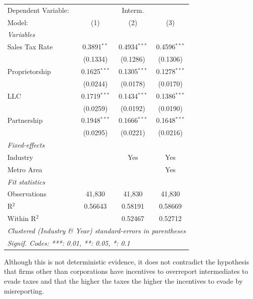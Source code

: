 \documentclass[
  12pt]{article}
\theoremstyle{definition}
\theoremstyle{remark}
\begin{document}
\begin{table}
\begin{minipage}{\linewidth}
\begingroup
\centering
\begin{tabular}{lccc}
   \tabularnewline \midrule \midrule
   Dependent Variable: & \multicolumn{3}{c}{Interm.}\\
   Model:         & (1)            & (2)            & (3)\\  
   \midrule
   \emph{Variables}\\
   Sales Tax Rate & 0.3891$^{**}$  & 0.4934$^{***}$ & 0.4596$^{***}$\\   
                  & (0.1334)       & (0.1286)       & (0.1306)\\   
   Proprietorship & 0.1625$^{***}$ & 0.1305$^{***}$ & 0.1278$^{***}$\\   
                  & (0.0244)       & (0.0178)       & (0.0170)\\   
   LLC            & 0.1719$^{***}$ & 0.1434$^{***}$ & 0.1386$^{***}$\\   
                  & (0.0259)       & (0.0192)       & (0.0190)\\   
   Partnership    & 0.1948$^{***}$ & 0.1666$^{***}$ & 0.1648$^{***}$\\   
                  & (0.0295)       & (0.0221)       & (0.0216)\\   
   \midrule
   \emph{Fixed-effects}\\
   Industry       &                & Yes            & Yes\\  
   Metro Area     &                &                & Yes\\  
   \midrule
   \emph{Fit statistics}\\
   Observations   & 41,830         & 41,830         & 41,830\\  
   R$^2$          & 0.56643        & 0.58191        & 0.58669\\  
   Within R$^2$   &                & 0.52467        & 0.52712\\  
   \midrule \midrule
   \multicolumn{4}{l}{\emph{Clustered (Industry \& Year) standard-errors in parentheses}}\\
   \multicolumn{4}{l}{\emph{Signif. Codes: ***: 0.01, **: 0.05, *: 0.1}}\\
\end{tabular}
\par\endgroup

\end{minipage}%

\end{table}%

Although this is not deterministic evidence, it does not contradict the
hypothesis that firms other than corporations have incentives to
overreport intermediates to evade taxes and that the higher the taxes
the higher the incentives to evade by misreporting.
\end{document}

